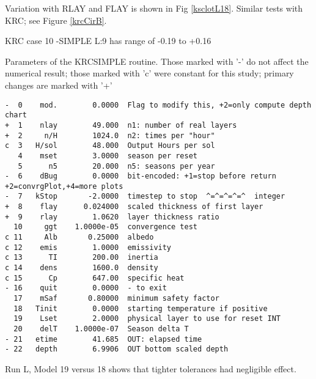 \documentclass{article}
\begin{document}
Variation with RLAY and FLAY is shown in Fig \ref{ksclotL18}.  Similar tests with KRC; see Figure \ref{krcCirB}. 
 
KRC case 10 -SIMPLE L:9 has range of -0.19 to +0.16


\begin{table} \caption[SIMPLE parameters]{Parameters of the KRCSIMPLE routine. 
Those marked with '-' do not affect the numerical result; those marked with 'c' were constant 
for this study; primary changes are marked with '+'} \label{sparm}
\begin{verbatim}
-  0    mod.        0.0000  Flag to modify this, +2=only compute depth chart
+  1    nlay        49.000  n1: number of real layers
+  2     n/H        1024.0  n2: times per "hour"
c  3   H/sol        48.000  Output Hours per sol
   4    mset        3.0000  season per reset
   5      n5        20.000  n5: seasons per year
-  6    dBug        0.0000  bit-encoded: +1=stop before return +2=convrgPlot,+4=more plots
-  7   kStop       -2.0000  timestep to stop  ^=^=^=^=^  integer
+  8    flay      0.024000  scaled thickness of first layer
+  9    rlay        1.0620  layer thickness ratio
  10     ggt    1.0000e-05  convergence test
c 11     Alb       0.25000  albedo
c 12    emis        1.0000  emissivity
c 13      TI        200.00  inertia
c 14    dens        1600.0  density
c 15      Cp        647.00  specific heat
- 16    quit        0.0000  - to exit
  17    mSaf       0.80000  minimum safety factor
  18   Tinit        0.0000  starting temperature if positive
  19    Lset        2.0000  physical layer to use for reset INT
  20    delT    1.0000e-07  Season delta T
- 21   etime        41.685  OUT: elapsed time
- 22   depth        6.9906  OUT bottom scaled depth
\end{verbatim}
\vspace{-3.0mm}
\hrulefill \end{table} 


Run L, Model 19 versus 18 shows that tighter tolerances had negligible effect.
\end{document}
